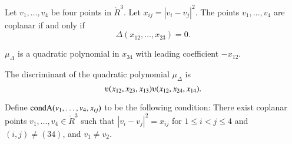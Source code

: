 \begin{tarskidata}
\begin{tarski}
\begin{lemma}
Let $v_1,\ldots,v_4$ be four points
in $\ring{R}^3$.  Let $x_{ij} = |v_i-v_j|^2$.
The points $v_1,\ldots,v_4$ are coplanar if and only if
	$$\Delta(x_{12},\ldots,x_{23}) = 0.$$
\end{lemma}

\begin{proved}
\swallowed\end{proved}
\end{tarski}





\begin{tarski}

\begin{lemma} 
$\mu_\Delta$  is a quadratic
polynomial in $x_{34}$ with leading coefficient $-x_{12}$. 
\end{lemma}

\begin{proved}
\swallowed\end{proved}
\end{tarski}



\begin{tarski}

\begin{lemma}
The discriminant of the quadratic polynomial $\mu_\Delta$ is
	$$
	\ups(x_{12},x_{23},x_{13}) \ups(x_{12},x_{24},x_{14}).
	$$
\end{lemma}

\begin{proved}
\swallowed\end{proved}
\end{tarski}




\begin{tarski}

\begin{definition}
Define ${\operatorname{condA}}(v_1,\ldots,v_4,x_{ij})$ to be the following condition:
There exist
coplanar points $v_1,\ldots,v_4\in\ring{R}^3$ such that $|v_i-v_j|^2 = x_{ij}$ for $1\le i < j \le 4$ and $(i,j)\ne (34)$, and $v_1\ne v_2$.
\end{definition}
\end{tarski}



\end{tarskidata}
